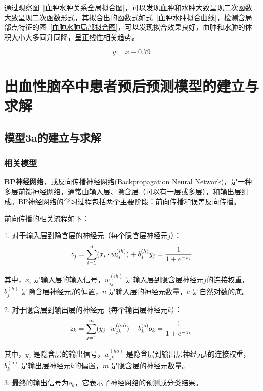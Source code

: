 \documentclass[bwprint]{gmcmthesis}
\begin{document}
通过观察图~\ref{血肿水肿关系全局拟合图}，可以发现血肿和水肿大致呈现二次函数大致呈现二次函数形式，其拟合出的函数式如式~\ref{血肿水肿拟合曲线}，检测含局部点特征的图~\ref{血肿水肿局部拟合图}，可以发现拟合效果良好，血肿和水肿的体积大小大多同升同降，呈正线性相关趋势。

\begin{equation}
y = x - 0.79
\label{血肿水肿拟合曲线}
\end{equation}

\section{出血性脑卒中患者预后预测模型的建立与求解}
\subsection{模型3a的建立与求解}
\subsubsection{相关模型}


\textbf{BP神经网络}，或反向传播神经网络(Backpropagation Neural Network)\cite{BP}，是一种多层前馈神经网络，通常由输入层、隐含层（可以有一层或多层），和输出层组成。BP神经网络的学习过程包括两个主要阶段：前向传播和误差反向传播。

前向传播的相关流程如下：

1. 对于输入层到隐含层的神经元（每个隐含层神经元$j$）：
\begin{equation}
z_j = \sum_{i=1}^{n} (x_i \cdot w_{ij}^{(ih)}) + b_j^{(h)} \\
y_j = \frac{1}{1 + e^{-z_j}}
\end{equation}

\noindent 其中，$x_i$ 是输入层的输入信号，$w_{ij}^{(ih)}$ 是输入层到隐含层神经元$j$的连接权重，$b_j^{(h)}$ 是隐含层神经元$j$的偏置，$n$ 是输入层的神经元数量，$e$ 是自然对数的底。

2. 对于隐含层到输出层的神经元（每个输出层神经元$k$）：
\begin{equation}
z_k = \sum_{j=1}^{m} (y_j \cdot w_{jk}^{(ho)}) + b_k^{(o)} \\
o_k = \frac{1}{1 + e^{-z_k}}
\end{equation}

\noindent 其中，$y_j$ 是隐含层的输出信号，$w_{jk}^{(ho)}$ 是隐含层到输出层神经元$k$的连接权重，$b_k^{(o)}$ 是输出层神经元$k$的偏置，$m$ 是隐含层的神经元数量。

3. 最终的输出信号为$o_k$，它表示了神经网络的预测或分类结果。
\end{document}
